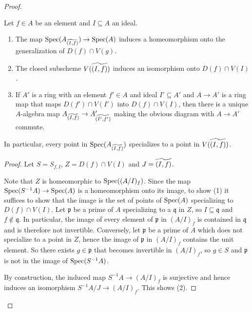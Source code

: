 \begin{proof}
\begin{lemma}[{\stacksproject{096V}}]
    Let $f \in A$ be an element and $I \subseteq A$ an ideal.
    \begin{enumerate}
        \item The map $\mathrm{Spec}(A_{\widetilde{(I, f)}}) \to \mathrm{Spec}(A)$ induces
            a homeomorphism onto the generalization of $D(f) \cap V(g)$.
        \item The closed subscheme $V(\widetilde{(I, f)})$ induces an isomorphism
            onto $D(f) \cap V(I)$.
            \label{item:closed-subscheme-tilde}
        \item If $A'$ is a ring with an element $f' \in A$ and ideal $I' \subseteq A'$ and
            $A \to A'$ is a ring map that maps
            $D(f') \cap V(I')$ into $D(f) \cap V(I)$, then there is a unique $A$-algebra map
            $A_{\widetilde{(I, f)}} \to A'_{\widetilde{(I', f')}}$ making the obvious
            diagram with $A \to A'$ commute.
    \end{enumerate}
    In particular, every
    point in $\mathrm{Spec}(A_{\widetilde{(I, f)}})$ specializes to a point in $V(\widetilde{(I, f)})$.
    \label{lemma:locally-closed-specializations}
\end{lemma}

\begin{proof}
    Let $S = S_{f, I}$, $Z = D(f) \cap V(I)$ and $J = \widetilde{(I, f)}$.

    Note that $Z$ is homeomorphic to $\mathrm{Spec}((A/I)_f)$.
    Since the map $\mathrm{Spec}(S^{-1}A) \to \mathrm{Spec}(A)$ is a homeomorphism onto its image, to show (1)
    it suffices to show that the image is the set of points of $\mathrm{Spec}(A)$ specializing to $D(f) \cap V(I)$.
    Let $\mathfrak{p}$ be a prime of $A$ specializing to a $\mathfrak{q}$ in $Z$,
    so $I \subseteq \mathfrak{q}$ and $f \not\in \mathfrak{q}$. In particular, the image
    of every element of $\mathfrak{p}$ in $(A / I)_f$ is contained in $\mathfrak{q}$ and
    is therefore not invertible.
    Conversely, let $\mathfrak{p}$ be a prime of $A$ which does not specialize to a point in
    $Z$, hence
    the image of $\mathfrak{p}$ in $(A/I)_f$ contains the unit element. So there exists
    $g \in \mathfrak{p}$ that becomes invertible in $(A / I)_f$, so $g \in S$ and
    $\mathfrak{p}$ is not in the image of $\mathrm{Spec}(S^{-1} A)$.

    By construction, the induced map $S^{-1}A \to (A / I)_f$ is surjective and hence
    induces an isomorphism $S^{-1}A / J \to (A / I)_f$. This shows (2).


\end{proof}
\end{proof}
